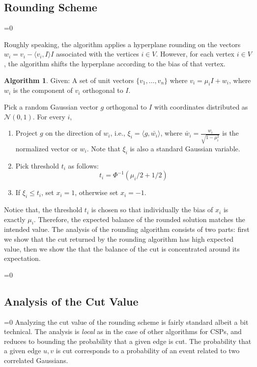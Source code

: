 \documentclass[11pt]{article}
\def\full{1}
\theoremstyle{definition}
\newtheorem{algorithm}[theorem]{Algorithm}
\newenvironment{mybox}
{\center \noindent\begin{boxedminipage}{1.0\linewidth}}
{\end{boxedminipage}
\noindent
}
\newcommand{\iprod}[1]{\langle#1\rangle}
\newcommand{\ie}{i.e.,\xspace}
\renewcommand{\leq}{\leqslant}
\numberwithin{equation}{section}
\begin{document}
\subsection{Rounding Scheme}
\ifnum\full=0 \vspace{-8pt}\fi

Roughly speaking, the algorithm applies a hyperplane rounding on
the vectors $w_i = v_i - \iprod{v_i,I}I$ associated with the vertices
$i \in V$.  However, for each vertex $i \in V$, the algorithm shifts
the hyperplane according to the bias of that vertex.

\begin{mybox}
\begin{algorithm} \label{alg:rounding}
Given: A set of unit vectors $\{v_1,\ldots,v_n\}$ where $v_i=\mu_i I+w_i$, where $w_i$ is the component of $v_i$ orthogonal to $I$.

Pick a random Gaussian vector $g$ orthogonal to $I$ with coordinates distributed as $\mathcal{N}(0,1)$.
For every $i$,
\begin{enumerate}
\item
Project $g$ on the direction of $w_i$, \ie
$
\xi_i=\langle g,\bar{w_i} \rangle
$,
where $\bar{w}_i=\frac{w_i}{\sqrt{1-\mu_i^2}}$ is the normalized vector or $w_i$. Note that $\xi_i$ is also a standard Gaussian variable.
\item
Pick threshold $t_i$ as follows:
$$
t_i=\Phi^{-1}(\mu_i/2+1/2)
$$

\item
If $\xi_i\leq t_i$, set $x_i=1$, otherwise set $x_i=-1$.
\end{enumerate}
\end{algorithm}
\end{mybox}

Notice that, the threshold $t_i$ is chosen so that individually the bias of $x_i$ is exactly $\mu_i$. Therefore, the expected balance of the rounded solution matches the intended value.
The analysis of the rounding algorithm consists of two parts: first we
show that the cut returned by the rounding algorithm has high expected
value, then we show the that the balance of the cut is concentrated
around its expectation.

\ifnum\full=0 \vspace{-8pt}\fi
\subsection{Analysis of the Cut Value}
\ifnum\full=0 \vspace{-8pt}\fi
Analyzing the cut value of the rounding scheme is fairly standard
albeit a bit technical.  The analysis is {\it local} as in the case of
other algorithms for CSPs, and reduces to bounding the probability
that a given edge is cut.  The probability that a given edge $u,v$ is
cut corresponds to a probability of an event related to two correlated
Gaussians.
\end{document}
